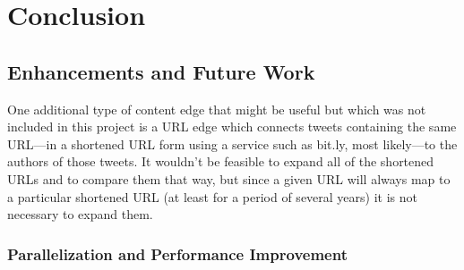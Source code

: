 \chapter{Conclusion}

\section{Enhancements and Future Work}

One additional type of content edge that might be useful but which was not included in this project is a URL edge which connects tweets containing the same URL---in a shortened URL form using a service such as bit.ly, most likely---to the authors of those tweets. It wouldn't be feasible to expand all of the shortened URLs and to compare them that way, but since a given URL will always map to a particular shortened URL (at least for a period of several years) it is not necessary to expand them.


\subsection{Parallelization and Performance Improvement}
